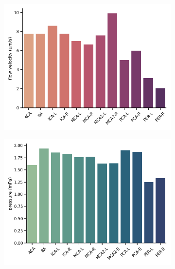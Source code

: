 \documentclass[fleqn,10pt]{wlscirep}
\begin{document}
\begin{figure}
\begin{subfigure}[b]{0.33\textwidth}
    \includegraphics[width =  \linewidth]{figures/vasomotion_arteries_labels_velocity.png}
    \end{subfigure}
    \begin{subfigure}[b]{0.33\textwidth}
    \centering
    \includegraphics[width =  \linewidth]{figures/sas_flow_arteries_labels_pressure.png}
    \end{subfigure}
         \begin{subfigure}[b]{0.33\textwidth}
    \centering

\end{subfigure}
\end{figure}
\end{document}
